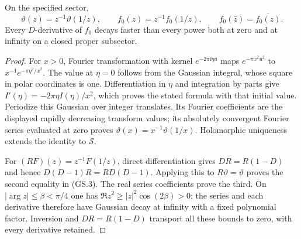 \begin{lemma}
On the specified sector,
\begin{equation}
 \vartheta(z)=z^{-1}\vartheta(1/z),\qquad
 f_0(z)=z^{-1}f_0(1/z),\qquad
 f_0(\bar z)=\overline{f_0(z)}.\tag{GS.3}
\end{equation}
Every $D$-derivative of $f_0$ decays faster than every power both at
zero and at infinity on a closed proper subsector.
\end{lemma}
\begin{proof}
For $x>0$, Fourier transformation with kernel $e^{-2\pi\ii \eta u}$
maps $e^{-\pi x^2u^2}$ to $x^{-1}e^{-\pi\eta^2/x^2}$.
The value at $\eta=0$ follows from the Gaussian integral, whose
square in polar coordinates is one. Differentiation in $\eta$ and
integration by parts give $I'(\eta)=-2\pi\eta I(\eta)/x^2$,
which proves the stated formula with that initial value.
Periodize this Gaussian over integer translates. Its Fourier
coefficients are the displayed rapidly decreasing transform values;
its absolutely convergent Fourier series evaluated at zero proves
$\vartheta(x)=x^{-1}\vartheta(1/x)$. Holomorphic uniqueness extends
the identity to $\mathcal S$.

For $(RF)(z)=z^{-1}F(1/z)$, direct differentiation gives
$DR=R(1-D)$ and hence $D(D-1)R=RD(D-1)$. Applying this to
$R\vartheta=\vartheta$ proves the second equality in (GS.3).
The real series coefficients prove the third. On
$|\arg z|\le\beta<\pi/4$ one has
$\Re z^2\ge |z|^2\cos(2\beta)>0$; the series and each
derivative therefore have Gaussian decay at infinity with a fixed
polynomial factor. Inversion and $DR=R(1-D)$ transport all these
bounds to zero, with every derivative retained.
\end{proof}

